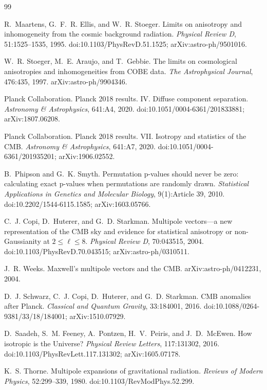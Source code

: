 \documentclass[11pt,a4paper]{article}
\begin{document}
\begin{thebibliography}{99}

R.~Maartens, G.~F.~R. Ellis, and W.~R. Stoeger.
\newblock Limits on anisotropy and inhomogeneity from the cosmic background
radiation.
\newblock \emph{Physical Review D}, 51:1525--1535, 1995.
\newblock doi:10.1103/PhysRevD.51.1525; arXiv:astro-ph/9501016.

W.~R. Stoeger, M.~E. Araujo, and T.~Gebbie.
\newblock The limits on cosmological anisotropies and inhomogeneities from
COBE data.
\newblock \emph{The Astrophysical Journal}, 476:435, 1997.
\newblock arXiv:astro-ph/9904346.

Planck Collaboration.
\newblock Planck 2018 results. IV. Diffuse component separation.
\newblock \emph{Astronomy \& Astrophysics}, 641:A4, 2020.
\newblock doi:10.1051/0004-6361/201833881; arXiv:1807.06208.

Planck Collaboration.
\newblock Planck 2018 results. VII. Isotropy and statistics of the CMB.
\newblock \emph{Astronomy \& Astrophysics}, 641:A7, 2020.
\newblock doi:10.1051/0004-6361/201935201; arXiv:1906.02552.

B.~Phipson and G.~K. Smyth.
\newblock Permutation p-values should never be zero: calculating exact
p-values when permutations are randomly drawn.
\newblock \emph{Statistical Applications in Genetics and Molecular Biology},
9(1):Article 39, 2010.
\newblock doi:10.2202/1544-6115.1585; arXiv:1603.05766.

C.~J. Copi, D.~Huterer, and G.~D. Starkman.
\newblock Multipole vectors---a new representation of the CMB sky and
evidence for statistical anisotropy or non-Gaussianity at $2\le\ell\le8$.
\newblock \emph{Physical Review D}, 70:043515, 2004.
\newblock doi:10.1103/PhysRevD.70.043515; arXiv:astro-ph/0310511.

J.~R. Weeks.
\newblock Maxwell's multipole vectors and the CMB.
\newblock arXiv:astro-ph/0412231, 2004.

D.~J. Schwarz, C.~J. Copi, D.~Huterer, and G.~D. Starkman.
\newblock CMB anomalies after Planck.
\newblock \emph{Classical and Quantum Gravity}, 33:184001, 2016.
\newblock doi:10.1088/0264-9381/33/18/184001; arXiv:1510.07929.

D.~Saadeh, S.~M. Feeney, A.~Pontzen, H.~V.~Peiris, and J.~D.~McEwen.
\newblock How isotropic is the Universe?
\newblock \emph{Physical Review Letters}, 117:131302, 2016.
\newblock doi:10.1103/PhysRevLett.117.131302; arXiv:1605.07178.

K.~S. Thorne.
\newblock Multipole expansions of gravitational radiation.
\newblock \emph{Reviews of Modern Physics}, 52:299--339, 1980.
\newblock doi:10.1103/RevModPhys.52.299.

\end{thebibliography}
\end{document}

